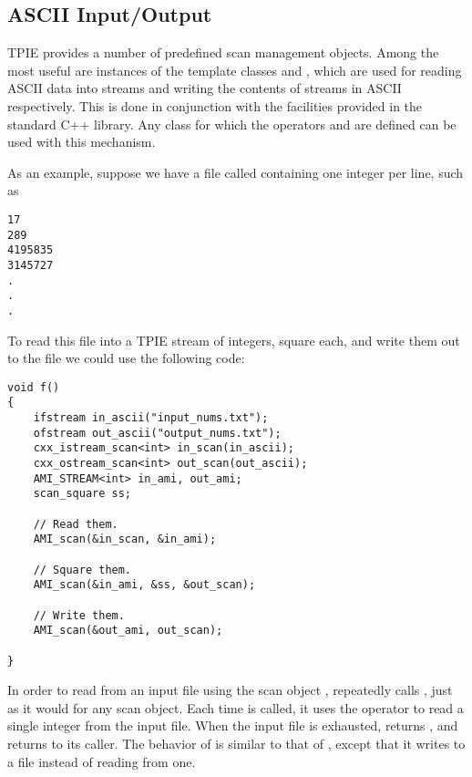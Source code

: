 \subsection{ASCII Input/Output} \label{sec:ascii-io}

TPIE provides a number of predefined scan management objects.  Among
the most useful are instances of the template classes
 and , which are
used for reading ASCII data into streams and writing the contents of
streams in ASCII respectively.  This is done in conjunction with the
 facilities provided in the standard C++ library.  Any
class  for which the operators  and 
are defined can be used with this mechanism.

As an example, suppose we have a file called 
containing one integer per line, such as

\begin{verbatim}
17
289
4195835
3145727
.
.
.
\end{verbatim}

To read this file into a TPIE stream of integers, square each, and
write them out to the file  we could use the
following code:

\begin{verbatim}
void f()
{
    ifstream in_ascii("input_nums.txt");
    ofstream out_ascii("output_nums.txt");
    cxx_istream_scan<int> in_scan(in_ascii);
    cxx_ostream_scan<int> out_scan(out_ascii);
    AMI_STREAM<int> in_ami, out_ami;
    scan_square ss;    

    // Read them.
    AMI_scan(&in_scan, &in_ami);

    // Square them.
    AMI_scan(&in_ami, &ss, &out_scan);
    
    // Write them.
    AMI_scan(&out_ami, out_scan);

}    
\end{verbatim}

In order to read from an input file using the scan object
,  repeatedly calls
, just as it would for any scan object.  Each
time  is called, it uses the \myverb{>>}
operator to read a single integer from the input file.  When the input
file is exhausted,  returns
, and  returns to its caller.
The behavior of  is similar to that of ,
except that it writes to a file instead of reading from one.

